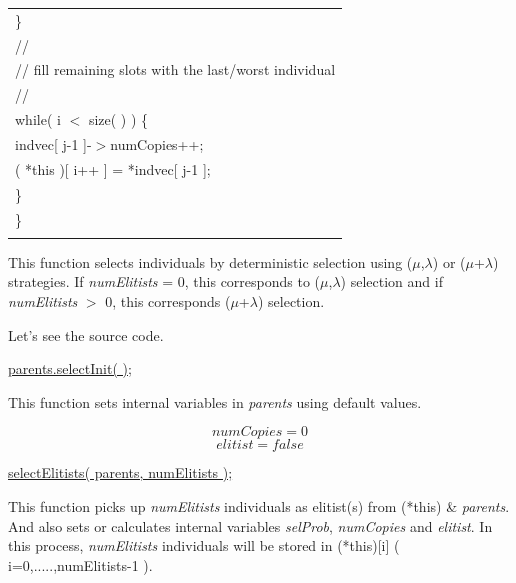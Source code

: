 \documentclass[twocolumn]{article}
\begin{document}
\begin{table}[h]
\begin{center}
{\begin{tabular}{|l|}
\hspace*{4mm} \}\\
\hspace*{4mm} //\\
\hspace*{4mm} // fill remaining slots with the last/worst individual\\
\hspace*{4mm} //\\
\hspace*{4mm} while( i $<$ size( ) ) \{\\
\hspace*{8mm} indvec[ j-1 ]-$>$numCopies++;\\
\hspace*{8mm} ( *this )[ i++ ] = *indvec[ j-1 ];\\
\hspace*{4mm} \}\\
\}\\
\hspace*{7cm}\\\hline
\end{tabular}
}
\end{center}
\end{table}

\noindent
This function selects individuals by deterministic selection using ($\mu$,$\lambda$) or
($\mu$+$\lambda$) strategies. If {\em numElitists} = 0, this
corresponds to ($\mu$,$\lambda$) selection and if {\em numElitists} $>$ 0,
this corresponds ($\mu$+$\lambda$) selection.

\noindent
Let's see the source code.

\vspace*{2mm}

\noindent
\underline{parents.selectInit( );}

\noindent
This function sets internal variables in {\em parents} using default values.

\begin{equation}
numCopies = 0
\end{equation}
\begin{equation}
elitist = false
\end{equation}

\vspace*{2mm}

\noindent
\underline{selectElitists( parents, numElitists );}

\noindent
This function picks up {\em numElitists} individuals as elitist(s) from
(*this) \& {\em parents}. And also sets or calculates internal variables {\em
selProb}, {\em numCopies} and {\em elitist}. In this process, {\em
numElitists} individuals will be stored in (*this)[i] ( i=0,.....,numElitists-1 ).
\end{document}
